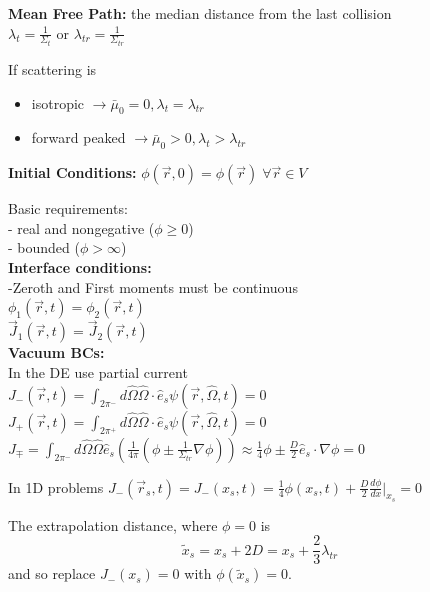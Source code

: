 \documentclass{report}
\newcommand{\tab}{\-\hspace{1cm}}
\newcommand{\Xs}{\Sigma}
\newcommand{\pos}{\vec{r}}
\newcommand{\cur}{\vec{J}}
\newcommand{\Oh}{\hat{\Omega}}
\newcommand{\rt}{(\pos,t)}
\newcommand{\rOt}{(\pos,\Oh,t)}
\begin{document}
\textbf{Mean Free Path:} the median distance from the last collision\\
$\lambda_t = \frac{1}{\Xs_t}$ or $\lambda_{tr} = \frac{1}{\Xs_{tr}}$

If scattering is 
\begin{itemize}
    \item isotropic $\rightarrow \bar{\mu}_0 = 0, \lambda_t = \lambda_{tr}$
    \item forward peaked $\rightarrow \bar{\mu}_0 > 0, \lambda_t > \lambda_{tr}$
\end{itemize}

\textbf{Initial Conditions:} $\phi(\pos,0) = \phi(\pos) \; \forall \pos \in V$

Basic requirements:\\
- real and nongegative ($\phi \geq 0$)\\
- bounded ($\phi > \infty$) \\

\textbf{Interface conditions:} \\
-Zeroth and First moments must be continuous\\
\tab$\phi_1\rt = \phi_2\rt$\\
\tab$\cur_1\rt = \cur_2\rt$\\

\textbf{Vacuum BCs:}\\
In the DE use partial current\\
\tab $J_{-}\rt = \int_{2\pi^{-}} d\Oh \Oh \cdot \hat{e}_s \psi\rOt = 0$\\
\tab $J_{+}\rt = \int_{2\pi^{+}} d\Oh \Oh \cdot \hat{e}_s \psi\rOt = 0$\\

$J_{\mp} = \int_{2\pi^{-}} d\Oh \Oh \hat{e}_s \left( \frac{1}{4\pi} \left( \phi \pm \frac{1}{\Xs_{tr}} \nabla \phi \right)\right) \approx \frac{1}{4}\phi \pm \frac{D}{2}\hat{e}_s \cdot \nabla \phi = 0$

In 1D problems
$J_{-}(\pos_s,t) = J_{-}(x_s,t) = \frac{1}{4}\phi(x_s,t) + \frac{D}{2}\frac{d\phi}{dx}|_{x_s} = 0$

The extrapolation distance, where $\phi = 0$ is
$$\tilde{x}_s = x_s + 2D = x_s + \frac{2}{3}\lambda_{tr}$$
and so replace $J_{-}(x_s) = 0$ with $ \phi(\tilde{x}_s) = 0$.
\end{document}
